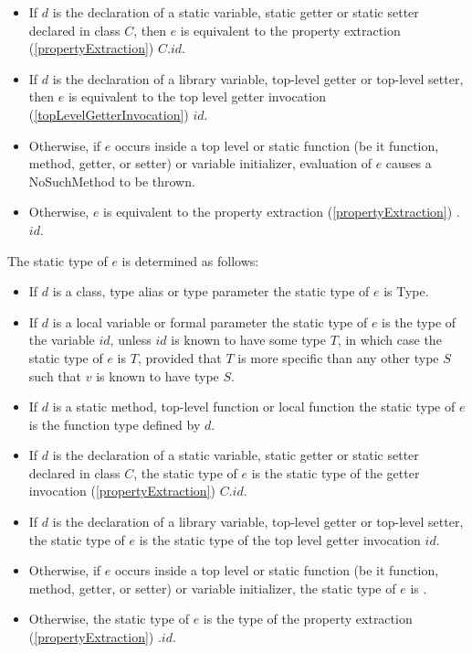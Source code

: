 \documentclass{article}
\newcommand{\code}[1]{{\sf #1}}
\begin{document}
\begin{itemize}
\item If $d$ is the declaration of a static variable, static getter or static setter declared in class $C$, then $e$ is equivalent to the property extraction (\ref{propertyExtraction}) $C.id$. 
\item If $d$ is the declaration of a library variable, top-level getter or top-level setter, then $e$ is equivalent to the top level getter invocation (\ref{topLevelGetterInvocation}) $id$. 
\item Otherwise, if $e$ occurs inside a top level or static function (be it function, method, getter,  or setter) or variable initializer, evaluation of $e$ causes a \code{NoSuchMethod} to be thrown.
\item Otherwise, $e$ is equivalent to the property extraction (\ref{propertyExtraction}) \THIS{}.$id$.
\end{itemize}

\LMHash{}
The static type of $e$ is determined as follows:

\begin{itemize}
\item If $d$ is a class, type alias or type parameter the static type of $e$ is \code{Type}.
\item If $d$ is a local variable or formal parameter the static type of $e$ is the type of the variable $id$, unless $id$ is known to have some type $T$, in which case the static type of $e$ is $T$, provided that $T$ is more specific than any other type $S$ such that $v$ is known to have type $S$. 
\item If $d$ is a static method, top-level function or local function the static type of $e$ is the function type defined by $d$.
\item If $d$ is the declaration of a static variable, static getter or static setter declared in class $C$, the static type of $e$ is the static type of the getter invocation (\ref{propertyExtraction}) $C.id$.
\item If $d$ is the declaration of a library variable, top-level getter or top-level setter, the static type of $e$  is the static type of the top level getter invocation $id$. 
\item Otherwise, if $e$ occurs inside a top level or static function (be it function, method, getter,  or setter) or variable initializer, the static type of $e$ is \DYNAMIC{}.
\item Otherwise, the static type of $e$ is the type of the property extraction (\ref{propertyExtraction}) \THIS{}.$id$.
\end{itemize}
\end{document}
